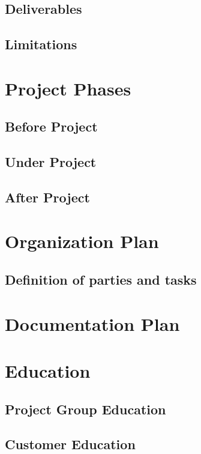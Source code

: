 \documentclass[a4paper,12pt]{article}
\begin{document}
\subsection{Deliverables}

\begin{LIPSleveranslista}
\LIPSleverans{}{}{}{}
\hline
\end{LIPSleveranslista}

\subsection{Limitations}

\section{Project Phases}		
\subsection{Before Project}
\subsection{Under Project}
\subsection{After Project}

\section{Organization Plan}
\subsection{Definition of parties and tasks}

\section{Documentation Plan}	

\section{Education}	
\subsection{Project Group Education}
\subsection{Customer Education}
\end{document}
